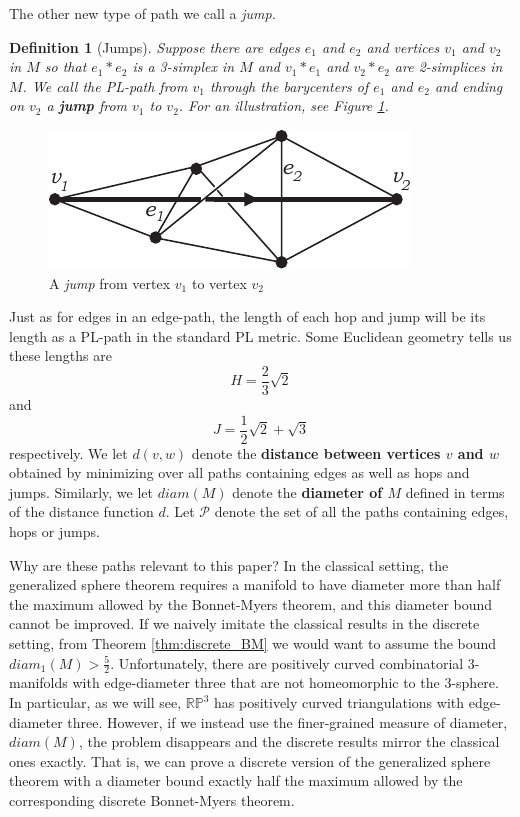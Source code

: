 \documentclass[12pt]{article}
\newtheorem{dfn}[thm]{Definition}
\begin{document}
\noindent The other new type of path we call a {\em jump.}

\begin{dfn}[Jumps] Suppose there are edges $e_1$ and $e_2$ and vertices $v_1$ and $v_2$ in $M$ so that $e_1*e_2$ is a 3-simplex in $M$ and $v_1*e_1$ and $v_2*e_2$ are 2-simplices in $M$. We call the PL-path from $v_1$ through the barycenters of $e_1$ and $e_2$ and ending on $v_2$ a \textbf{jump} from $v_1$ to $v_2$. For an illustration, see Figure \ref{fig:jump}.
\end{dfn}

\begin{figure}
	\centering
		\includegraphics[width=0.30\linewidth]{figures/jump.pdf}
    \caption{A {\em jump} from vertex $v_1$ to vertex $v_2$}
    \label{fig:jump}
\end{figure}

Just as for edges in an edge-path, the length of each hop and jump will be its length as a PL-path in the standard PL metric. Some Euclidean geometry tells us these lengths are \begin{equation} \label{eqn:jump_length} H = \frac{2}{3}\sqrt{2} \end{equation} and \begin{equation} \label{eqn:jump_length} J = \frac{1}{2}\sqrt{2} + \sqrt{3} \end{equation} respectively. We let $d(v,w)$ denote the \textbf{distance between vertices $v$ and $w$} obtained by minimizing over all paths containing edges as well as hops and jumps. Similarly, we let $diam(M)$ denote the \textbf{diameter of $M$} defined in terms of the distance function $d$. Let $\mathcal{P}$ denote the set of all the paths containing edges, hops or jumps.

Why are these paths relevant to this paper? In the classical setting, the generalized sphere theorem requires a manifold to have diameter more than half the maximum allowed by the Bonnet-Myers theorem, and this diameter bound cannot be improved. If we naively imitate the classical results in the discrete setting, from Theorem \ref{thm:discrete_BM} we would want to assume the bound $diam_1(M)>\frac{5}{2}$. Unfortunately, there are positively curved combinatorial 3-manifolds with edge-diameter three that are not homeomorphic to the 3-sphere. In particular, as we will see, $\mathbb{RP}^3$ has positively curved triangulations with edge-diameter three. However, if we instead use the finer-grained measure of diameter, $diam(M)$, the problem disappears and the discrete results mirror the classical ones exactly. That is, we can prove a discrete version of the generalized sphere theorem with a diameter bound exactly half the maximum allowed by the corresponding discrete Bonnet-Myers theorem.
\end{document}

